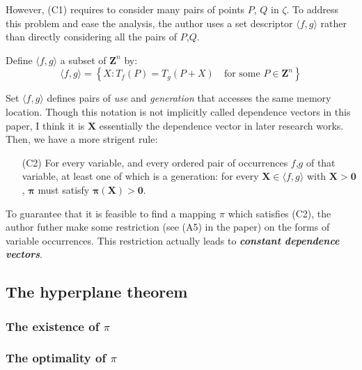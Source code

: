 However, (C1) requires to consider many pairs of points $P$, $Q$ in $\zeta$.
To address this problem and ease the analysis, the author uses a set descriptor
$\langle f,g \rangle$ rather than directly considering all the pairs of $P$,$Q$.

Define $\langle f,g \rangle$ a subset of $\mathbf{Z}^n$ by:
$$\langle f,g \rangle=\left\{X:T_f(P)=T_g(P+X)\quad \text{for some } P \in \mathbf{Z}^n\right\}$$

Set $\langle f, g \rangle$ defines pairs of \textit{use} and \textit{generation} that
accesses the same memory location. Though this notation is not implicitly called
dependence vectors in this paper, I think it is $\mathbf{X}$ essentially the
dependence vector in later research works. Then, we have a more strigent rule:

\begin{info}
\begin{itemize}
\item [(C2)]
  For every variable, and every ordered pair of occurrences $f$,$g$ of that variable,
  at least one of which is a generation: for every $\mathbf{X} \in \langle f, g \rangle$
  with $\mathbf{X}>\mathbf{0}$, $\mathbf{\pi}$ must satisfy $\mathbf{\pi}(\mathbf{X})>\mathbf{0}$.
\end{itemize}
\end{info}

To guarantee that it is feasible to find a mapping $\pi$ which satisfies (C2),
the author futher make some restriction (see (A5) in the paper) on the forms of
variable occurrences. This restriction actually leads to \textbf{\textit{constant dependence vectors}}.

\subsection{The hyperplane theorem}

\subsubsection{The existence of $\pi$}


\subsubsection{The optimality of $\pi$}

